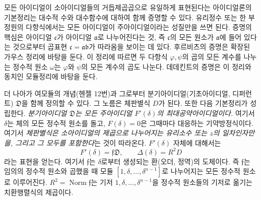 모든 아이디얼이 소아이디얼들의 거듭제곱곱으로 유일하게 표현된다는 아이디얼론의 기본정리는 대수적 수와 대수함수에 대하여 함께 증명할 수 있다. 유리정수 또는 한 부정원의 다항식에서는 모든 아이디얼이 주아이디얼이라는 성질만을 쓰면 된다. 증명의 핵심은 아이디얼 \(\mathfrak c\)가 아이디얼 \(\mathfrak a\)로 나누어진다는 것, 즉 \(\mathfrak c\)의 모든 원소가 \(\mathfrak a\)에 들어 있다는 것으로부터 곱표현 \(\mathfrak c=\mathfrak a\mathfrak b\)가 따라옴을 보이는 데 있다. 후르비츠의 증명은 \glqq{}확장된 가우스 정리\grqq{}에 바탕을 둔다. 이 정리에 따르면 두 다항식 \(\varphi,\psi\)의 곱의 모든 계수를 나누는 정수적 원소 \(\omega\)는 \(\varphi\)와 \(\psi\)의 모든 계수의 곱도 나눈다. 데데킨트의 증명은 이 정리와 동치인 모듈정리에 바탕을 둔다.

더 나아가 여모듈의 개념(헨젤 12번)과 그로부터 분기아이디얼(기초아이디얼, 디퍼런트) \(\mathfrak D\)을 함께 정의할 수 있다. 그 노름은 체판별식 \(D\)가 된다. 또한 다음 기본정리가 성립한다. \emph{분기아이디얼 \(\mathfrak D\)는 모든 주아이디얼 \(F'(\delta)\)의 최대공약아이디얼이다.} 여기서 \(\delta\)는 체의 모든 정수적 원소를 돌고, \(F(\delta)=0\)은 그때마다 대응하는 기약방정식이다. 여기서 \emph{체판별식은 소아이디얼의 제곱으로 나누어지는 유리소수 또는 \(z\)의 일차인자만을, 그리고 그 모두를 포함한다}는 것이 따라온다. \(F'(\delta)\) 자체에 대해서는
\[
F'(\delta)=\mathfrak f\mathfrak D,\qquad
\Delta(\delta)=R^2D
\]
라는 표현을 얻는다. 여기서 \(\mathfrak f\)는 \(\delta\)로부터 생성되는 환(오더, 정역)의 도체이다. 즉 \(\mathfrak f\)는 임의의 정수적 원소와 곱했을 때 모듈 \([1,\delta,\ldots,\delta^{n-1}]\)로 나누어지는 모든 정수적 원소로 이루어진다. \(R^2=\operatorname{Norm}\mathfrak f\)는 기저 \(1,\delta,\ldots,\delta^{n-1}\)을 정수적 원소들의 기저로 옮기는 치환행렬식의 제곱이다.

